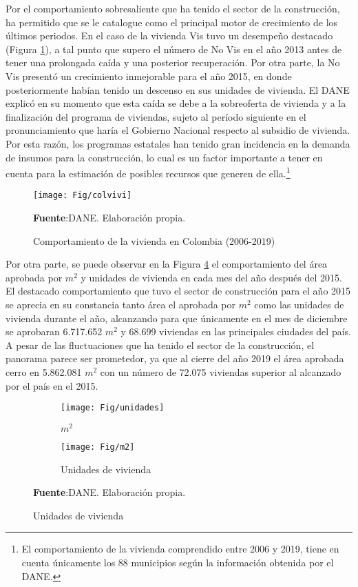 \documentclass[12pt]{article}
\begin{document}
Por el comportamiento sobresaliente que ha tenido el sector de la construcción, ha permitido que se le catalogue  como el principal motor de crecimiento de los últimos periodos. En el caso de la vivienda Vis tuvo un desempeño destacado (Figura \ref{5}), a tal punto que supero el número de No Vis en el año 2013 antes de tener una prolongada caída y una posterior recuperación. Por otra parte, la No Vis presentó un crecimiento inmejorable para el año 2015, en donde posteriormente habían tenido un descenso en sus unidades de vivienda. El DANE explicó en su momento que esta caída se debe a la sobreoferta de vivienda y a la finalización del programa de viviendas, sujeto al período siguiente en el pronunciamiento que haría el Gobierno Nacional respecto al subsidio de vivienda. Por esta razón, los programas estatales han tenido gran incidencia en la demanda de insumos para la construcción, lo cual es un factor importante a tener en cuenta para la estimación de posibles recursos que generen de ella.\footnote{El comportamiento de la vivienda comprendido entre 2006 y 2019, tiene en cuenta únicamente los 88 municipios según la información obtenida por el DANE.}

	\begin{figure}[H]
  	\centering 		
  	\caption{Comportamiento de la vivienda en Colombia (2006-2019)}
	\texttt{[image: Fig/colvivi]}
\raggedright  \scriptsize \textbf{Fuente}:DANE. Elaboración propia.
	\label{5}	
	\end{figure}
	
Por otra parte, se puede observar en la Figura \ref{611} el comportamiento del área aprobada por $m^2$ y unidades de vivienda en cada mes del año después del 2015. El destacado comportamiento que tuvo el sector de construcción para el año 2015 se aprecia en su constancia tanto área el aprobada por $m^2$ como las unidades de vivienda durante el año, alcanzando para que únicamente en el mes de diciembre se aprobaran 6.717.652 $m^2$ y 68.699 viviendas en las principales ciudades del país. A pesar de las fluctuaciones que ha tenido el sector de la construcción, el panorama parece ser prometedor, ya que al cierre del año 2019 el área aprobada cerro en 5.862.081 $m^2$ con un número de 72.075 viviendas superior al alcanzado por el país en el 2015.

\begin{figure}[H]
\caption{Comportamiento estacional del área aprobada por $m^2$ y unidades de vivienda (2015-2019)}
\begin{subfigure}{0.48\textwidth}
  \centering
	\texttt{[image: Fig/unidades]} 
  \caption{$m^2$}
  \label{61}
\end{subfigure}
\begin{subfigure}{0.48\textwidth}
  \centering
	\texttt{[image: Fig/m2]} 
  \caption{Unidades de vivienda}
  \label{62}
\end{subfigure}
\raggedright  \scriptsize \textbf{Fuente}:DANE. Elaboración propia.
	\label{611}	
\end{figure}
\end{document}
